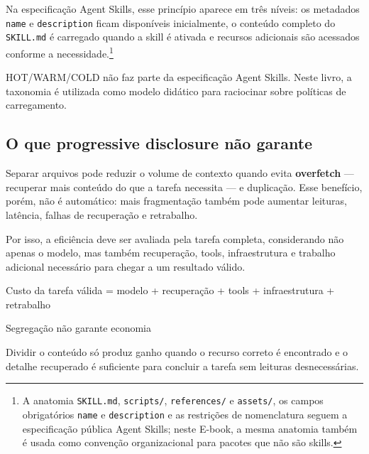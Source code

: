 \documentclass[
  10pt,
  a4paper,
  oneside]{book}
\newenvironment{Shaded}{}{}
\newcommand{\NormalTok}[1]{#1}
\renewenvironment{Shaded}{\begin{snugshade}}{\end{snugshade}}%
\begin{document}
Na especificação Agent Skills, esse princípio aparece em três níveis: os
metadados \texttt{name} e \texttt{description} ficam disponíveis
inicialmente, o conteúdo completo do \texttt{SKILL.md} é carregado
quando a skill é ativada e recursos adicionais são acessados conforme a
necessidade.\footnote{A anatomia \texttt{SKILL.md}, \texttt{scripts/},
  \texttt{references/} e \texttt{assets/}, os campos obrigatórios
  \texttt{name} e \texttt{description} e as restrições de nomenclatura
  seguem a especificação pública Agent Skills; neste E-book, a mesma
  anatomia também é usada como convenção organizacional para pacotes que
  não são skills.}

HOT/WARM/COLD não faz parte da especificação Agent Skills. Neste livro,
a taxonomia é utilizada como modelo didático para raciocinar sobre
políticas de carregamento.

\hypertarget{o-que-progressive-disclosure-nuxe3o-garante}{%
\subsection{O que progressive disclosure não
garante}\label{o-que-progressive-disclosure-nuxe3o-garante}}

Separar arquivos pode reduzir o volume de contexto quando evita
\textbf{overfetch} --- recuperar mais conteúdo do que a tarefa necessita
--- e duplicação. Esse benefício, porém, não é automático: mais
fragmentação também pode aumentar leituras, latência, falhas de
recuperação e retrabalho.

Por isso, a eficiência deve ser avaliada pela tarefa completa,
considerando não apenas o modelo, mas também recuperação, tools,
infraestrutura e trabalho adicional necessário para chegar a um
resultado válido.

\begin{Shaded}
\begin{Highlighting}[]
\NormalTok{Custo da tarefa válida}
\NormalTok{    = modelo}
\NormalTok{    + recuperação}
\NormalTok{    + tools}
\NormalTok{    + infraestrutura}
\NormalTok{    + retrabalho}
\end{Highlighting}
\end{Shaded}

\begin{warningbox}{Segregação não garante economia}

Dividir o conteúdo só produz ganho quando o recurso correto é encontrado
e o detalhe recuperado é suficiente para concluir a tarefa sem leituras
desnecessárias.

\end{warningbox}
\end{document}
